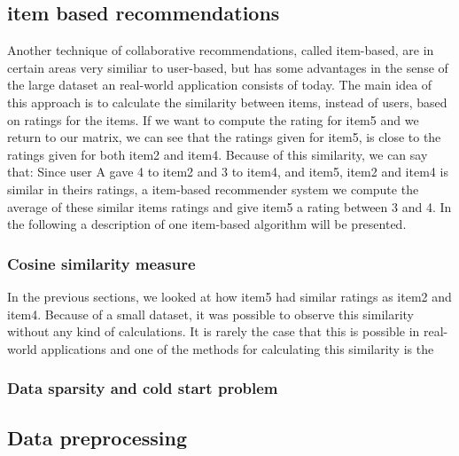 
\subsection{item based recommendations} %
\label{sub:item_based_recommendations}
Another technique of collaborative recommendations, called item-based, are in certain areas very similiar to user-based, but has some advantages in the sense of the large dataset an real-world application consists of today. The main idea of this approach is to calculate the similarity between items, instead of users, based on ratings for the items. If we want to compute the rating for item5 and we return to our matrix, we can see that the ratings given for item5, is close to the ratings given for both item2 and item4. Because of this similarity, we can say that: Since user A gave 4 to item2 and 3 to item4, and item5, item2 and item4 is similar in theirs ratings, a item-based recommender system we compute the average of these similar items ratings and give item5 a rating between 3 and 4. 
In the following a description of one item-based algorithm will be presented. 
\subsubsection{Cosine similarity measure}
In the previous sections, we looked at how item5 had similar ratings as item2 and item4. Because of a small dataset, it was possible to observe this similarity without any kind of calculations. It is rarely the case that this is possible in real-world applications and one of the methods for calculating this similarity is the \
\subsubsection{Data sparsity and cold start problem}

\subsection{Data preprocessing} %
\label{sub:data_preprocessing}


